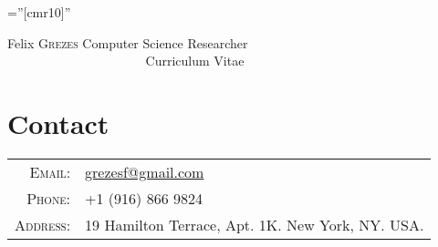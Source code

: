 \documentclass[a4paper,10pt]{article}
\begin{document}

\pagestyle{empty} %

\font\fb=''[cmr10]'' %

\par{
		{\Huge Felix \textsc{Grezes}
\hfill
{\huge Computer Science Researcher}$~$\\
$~~~~~~~~~~~~~~~~~~~~~~~~~~~~~~~~~~~~~~~~~~~~~~~~~${\huge Curriculum Vitae}
	}\bigskip\par}

\section{Contact}
\begin{tabular}{rl}
\textsc{Email:}     & \href{mailto:grezesf@gmail.com}{grezesf@gmail.com}\\
\textsc{Phone:}     & +1 (916) 866 9824\\
\textsc{Address:}   & 19 Hamilton Terrace, Apt. 1K. New York, NY. USA.  \\
\end{tabular}
\bigskip

\end{document}
